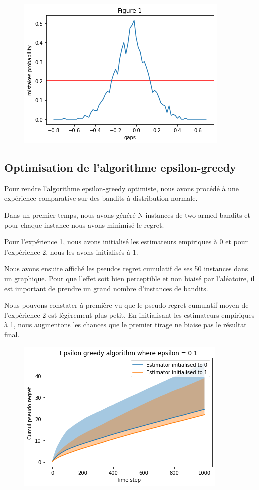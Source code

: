 \documentclass[letterpaper,11pt]{article}
\begin{document}
\begin{figure}[H]
\label{fig: no1_1}
\begin{center}
\includegraphics[scale=0.8]{fig1_no1_1.png}
\end{center}
\end{figure}


\subsection{Optimisation de l'algorithme epsilon-greedy}
Pour rendre l'algorithme epsilon-greedy optimiste, nous avons procédé à une expérience comparative sur des bandits à distribution normale.

Dans un premier temps, nous avons généré N instances de two armed bandits et pour chaque instance nous avons minimisé le regret.

Pour l'expérience 1, nous avons initialisé les estimateurs empiriques à 0 et pour l'expérience 2, nous les avons initialisés à 1.

Nous avons ensuite affiché les pseudos regret cumulatif de ses 50 instances dans un graphique.
Pour que l'effet soit bien perceptible et non biaisé par l'aléatoire, il est important de prendre un grand nombre d'instances de bandits.

Nous pouvons constater à première vu que le pseudo regret cumulatif moyen de l'expérience 2 est lègèrement plus petit.
En initialisant les estimateurs empiriques à 1, nous augmentons les chances que le premier tirage ne biaise pas le résultat final.


\begin{figure}[H]
\label{fig: no1_2}
\begin{center}
\includegraphics[scale=0.8]{fig2_no1_2.png}
\end{center}
\end{figure}
\end{document}
